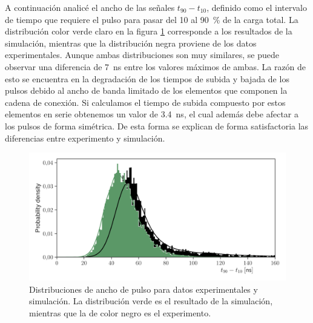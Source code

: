 A continuación analicé el ancho de las señales $t_{90}-t_{10}$, definido como el intervalo de tiempo que requiere el pulso para pasar del \num{10} al \SI{90}{\percent} de la carga total. La distribución color verde claro en la figura \ref{fig:t90-distribution} corresponde a los resultados de la simulación, mientras que la distribución negra proviene de los datos experimentales. Aunque ambas distribuciones son muy similares, se puede observar una diferencia de \SI{7}{\ns} entre los valores máximos de ambas. La razón de esto se encuentra en la degradación de los tiempos de subida y bajada de los pulsos debido al ancho de banda limitado de los elementos que componen la cadena de conexión. Si calculamos el tiempo de subida compuesto por estos elementos en serie obtenemos un valor de \SI{3.4}{\ns}, el cual además debe afectar a los pulsos de forma simétrica. De esta forma se explican de forma satisfactoria las diferencias entre experimento y simulación.

\begin{figure}
        \centering
        \includegraphics[width=\textwidth]{t90_dist.pdf}
        \caption{Distribuciones de ancho de pulso para datos experimentales y simulación. La distribución verde es el resultado de la simulación, mientras que la de color negro es el experimento.}
        \label{fig:t90-distribution}
\end{figure}

